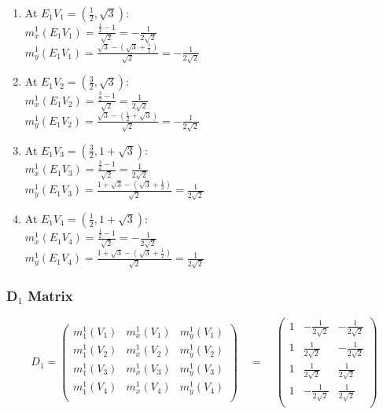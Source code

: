 \documentclass{article}
\begin{document}
\begin{multicols}{2}
\begin{enumerate}
    \item At $E_1V_1 = \left(\frac{1}{2}, \sqrt{3}\right)$:\\
    $m_x^1(E_1V_1) = \frac{\frac{1}{2} - 1}{\sqrt{2}} = -\frac{1}{2\sqrt{2}}$\\
    $m_y^1(E_1V_1) = \frac{\sqrt{3} - \left(\sqrt{3} + \frac{1}{2}\right)}{\sqrt{2}} = -\frac{1}{2\sqrt{2}}$

    \item At $E_1V_2 = \left(\frac{3}{2}, \sqrt{3}\right)$:\\
    $m_x^1(E_1V_2) = \frac{\frac{3}{2} - 1}{\sqrt{2}} = \frac{1}{2\sqrt{2}}$ \\
    $m_y^1(E_1V_2) = \frac{\sqrt{3} - \left(\frac{1}{2} + \sqrt{3}\right)}{\sqrt{2}} = -\frac{1}{2\sqrt{2}}$

    \item At $E_1V_3 = \left(\frac{3}{2}, 1 + \sqrt{3}\right)$:\\
    $m_x^1(E_1V_3) = \frac{\frac{3}{2} - 1}{\sqrt{2}} = \frac{1}{2\sqrt{2}}$ \\
    $m_y^1(E_1V_3) = \frac{1 + \sqrt{3} - \left(\sqrt{3} + \frac{1}{2}\right)}{\sqrt{2}} = \frac{1}{2\sqrt{2}}$

    \item At $E_1V_4 = \left(\frac{1}{2}, 1 + \sqrt{3}\right)$:\\
    $m_x^1(E_1V_4) = \frac{\frac{1}{2} - 1}{\sqrt{2}} = -\frac{1}{2\sqrt{2}}$ \\
    $m_y^1(E_1V_4) = \frac{1 + \sqrt{3} - \left(\sqrt{3} + \frac{1}{2}\right)}{\sqrt{2}} = \frac{1}{2\sqrt{2}}$
\end{enumerate}
\end{multicols}


\subsubsection{D$_1$ Matrix}
$$D_1 = \begin{pmatrix}
    m_1^1(V_1) & m_x^1(V_1) & m_y^1(V_1)\\
    m_1^1(V_2) & m_x^1(V_2) & m_y^1(V_2)\\
    m_1^1(V_3) & m_x^1(V_3) & m_y^1(V_3)\\
    m_1^1(V_4) & m_x^1(V_4) & m_y^1(V_4)\\
\end{pmatrix} \quad = \quad
\begin{pmatrix}
    1 & -\frac{1}{2\sqrt{2}} & -\frac{1}{2\sqrt{2}}\\
    1 & \frac{1}{2\sqrt{2}} & -\frac{1}{2\sqrt{2}}\\
    1 & \frac{1}{2\sqrt{2}} & \frac{1}{2\sqrt{2}}\\
    1 & -\frac{1}{2\sqrt{2}} & \frac{1}{2\sqrt{2}}\\
\end{pmatrix}$$
\end{document}
